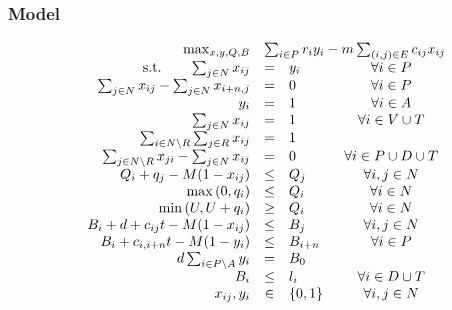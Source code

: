 \documentclass[letterpaper]{article} %
\begin{document}
\subsubsection*{Model}
\begin{equation}
\begin{array}{rrclcl}
& \max_{x, y, Q, B} & \multicolumn{3}{l}{ \sum_{i \in P} r_i y_i - m \sum_{(i,j) \in E} c_{ij} x_{ij}  } \\  
& \textrm{s.t.} \qquad  \sum_{j \in N} x_{ij}   &=& y_i & \forall i \in P \\   %
& \sum_{j \in N} x_{ij} - \sum_{j \in N} x_{i+n,j}  & = & 0 & \forall i \in P  \\     %
& y_i & =& 1 & \forall i \in A \\  %
& \sum_{j \in N} x_{ij}   &=& 1 & \forall i \in V \cup T \\  %
& \sum_{i \in N \setminus R } \sum_{j \in R }  x_{ij}   &=& 1  &\\     %
& \sum_{j \in N \setminus R } x_{ji} - \sum_{j \in N} x_{ij}  & = & 0 & \forall i \in P \cup D \cup T  \\     %
& Q_i + q_j - M (1-x_{ij} ) &\leq& Q_j & \forall i,j \in N \\  %
& \max{(0, q_i)}    &\leq& Q_i & \forall i \in N \\  %
& \min{(U, U+q_i)}    &\geq& Q_i & \forall i \in N \\  %
& B_i + d + c_{ij} t -  M (1-x_{ij} )  &\leq& B_j   & \forall i,j \in N \\  %
& B_i +  c_{i, i+n} t -  M (1- y_i )  &\leq& B_{i+n}  & \forall i \in P \\ %
&  d \sum_{i \in P \setminus A}  y_i  & = & B_0  \\ %
& B_i  &\leq& l_i  & \forall i \in D \cup T \\ %
& x_{ij}, y_i &\in& \{0, 1\} & \forall i,j \in N  \\ 
\end{array}
\end{equation}

\clearpage
\end{document}
